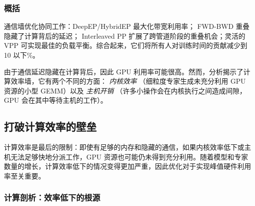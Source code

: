 

\subsubsection{概括}
通信墙优化协同工作：DeepEP/HybridEP 最大化带宽利用率； FWD-BWD 重叠隐藏了计算背后的延迟； Interleaved PP 扩展了跨管道阶段的重叠机会；灵活的 VPP 可实现最佳的负载平衡。综合起来，它们将所有人对训练时间的贡献减少到 10 以下\%。

由于通信延迟隐藏在计算背后，因此 GPU 利用率可能很高。然而，分析揭示了计算效率墙，它有两个不同的方面： \textit{内核效率} （细粒度专家生成未充分利用 GPU 资源的小型 GEMM）以及 \textit{主机开销} （许多小操作会在内核执行之间造成间隙，GPU 会在其中等待主机的工作）。

\subsection{打破计算效率的壁垒}\label{sec:compute-wall}

计算效率是最后的限制：即使有足够的内存和隐藏的通信，如果内核效率低下或主机无法足够快地分派工作，GPU 资源也可能仍未得到充分利用。随着模型和专家数量的增长，计算效率低下的情况变得更加严重，因此优化对于实现峰值硬件利用率至关重要。

\subsubsection{计算剖析：效率低下的根源}


